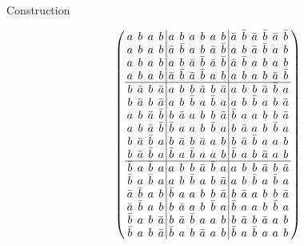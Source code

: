 \documentclass{beamer}
\begin{document}
\begin{frame}{Construction}

  \[
    \arraycolsep=2.0pt\def\arraystretch{0.75}
    \left(
      \begin{array}{cccc|cccccc|cccccc}
        a&b&a&b&a&b&a&b&a&b&\bar{a}&\bar{b}&\bar{a}&\bar{b}&\bar{a}&\bar{b}\\
        a&b&a&b&\bar{a}&\bar{b}&a&b&\bar{a}&\bar{b}&a&b&\bar{a}&\bar{b}&a&b\\
        a&b&a&b&a&b&\bar{a}&\bar{b}&\bar{a}&\bar{b}&\bar{a}&\bar{b}&a&b&a&b\\
        a&b&a&b&\bar{a}&\bar{b}&\bar{a}&\bar{b}&a&b&a&b&a&b&\bar{a}&\bar{b}\\\hline
        b&\bar{a}&b&\bar{a}&a&b&b&\bar{a}&b&\bar{a}&a&b&b&\bar{a}&\bar{b}&a\\
        b&\bar{a}&b&\bar{a}&a&b&\bar{b}&a&\bar{b}&a&a&b&\bar{b}&a&b&\bar{a}\\
        a&b&\bar{a}&\bar{b}&b&\bar{a}&a&b&b&\bar{a}&\bar{b}&a&a&b&b&\bar{a}\\
        a&b&\bar{a}&\bar{b}&\bar{b}&a&a&b&\bar{b}&a&b&\bar{a}&a&b&\bar{b}&a\\
        b&\bar{a}&\bar{b}&a&b&\bar{a}&b&\bar{a}&a&b&b&\bar{a}&\bar{b}&a&a&b\\
        b&\bar{a}&\bar{b}&a&\bar{b}&a&\bar{b}&a&a&b&\bar{b}&a&b&\bar{a}&a&b\\\hline
        \bar{b}&a&\bar{b}&a&a&b&b&\bar{a}&\bar{b}&a&a&b&b&\bar{a}&b&\bar{a}\\
        \bar{b}&a&\bar{b}&a&a&b&\bar{b}&a&b&\bar{a}&a&b&\bar{b}&a&\bar{b}&a\\
        \bar{a}&\bar{b}&a&b&\bar{b}&a&a&b&b&\bar{a}&b&\bar{a}&a&b&b&\bar{a}\\
        \bar{a}&\bar{b}&a&b&b&\bar{a}&a&b&\bar{b}&a&\bar{b}&a&a&b&\bar{b}&a\\
        \bar{b}&a&b&\bar{a}&b&\bar{a}&\bar{b}&a&a&b&b&\bar{a}&b&\bar{a}&a&b\\
        \bar{b}&a&b&\bar{a}&\bar{b}&a&b&\bar{a}&a&b&\bar{b}&a&\bar{b}&a&a&b\\
      \end{array}
    \right)
  \]
  
\end{frame}
\end{document}
